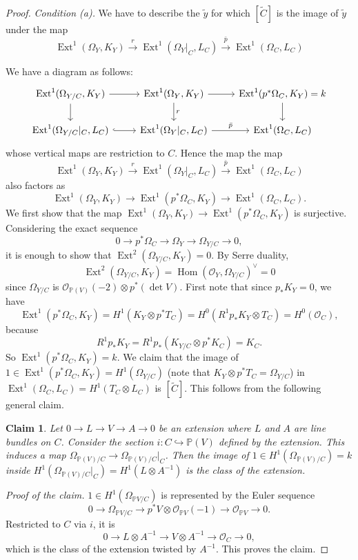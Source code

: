 \documentclass[11pt,twoside]{amsart}
\theoremstyle{plain}
\newtheorem{claim}[theorem]{Claim}
\theoremstyle{definition}
\newcommand{\PP}{\mathbb{P}}
\newcommand{\OO}{\mathcal{O}}
\newcommand{\Hom}{\operatorname{Hom}}
\newcommand{\Ext}{\operatorname{Ext}}
\newcommand{\Ct}{\widetilde{C}}
\newcommand{\yt}{\tilde{y}}
\begin{document}
\begin{proof}
\emph{Condition (a).} We have to describe the $\yt$ for which $[\Ct]$ is the image of $\yt$ under the map
\[
\Ext^1(\Omega_Y,K_Y)\xrightarrow{\ r\ }\Ext^1(\Omega_Y|_C,L_C)\xrightarrow{\ \bar p\ }\Ext^1(\Omega_C,L_C)
\]

We have a diagram as follows:
\begin{equation}\label{diag:B}
\begin{tikzcd}
\Ext^1(\Omega_{Y/C},K_Y)\arrow[r]\arrow[d] & \Ext^1(\Omega_Y,K_Y)\arrow[r]\arrow[d,"r"] & \Ext^1(p^*\Omega_C,K_Y)=k\arrow[d]\\
\Ext^1(\Omega_{Y/C}|_C,L_C)\arrow[r,hook] & \Ext^1(\Omega_Y|_C,L_C)\arrow[r,"\bar p"] & \Ext^1(\Omega_C,L_C)
\end{tikzcd}
\end{equation}
whose vertical maps are restriction to $C$.
Hence the map the map
\[
\Ext^1(\Omega_Y,K_Y)\xrightarrow{\ r\ }\Ext^1(\Omega_Y|_C,L_C)\xrightarrow{\ \bar p\ }\Ext^1(\Omega_C,L_C)
\]
also factors as
\[
\Ext^1(\Omega_Y,K_Y)\to\Ext^1(p^*\Omega_C,K_Y)\to\Ext^1(\Omega_C,L_C).
\]
We first show that the map $\Ext^1(\Omega_Y,K_Y)\to\Ext^1(p^*\Omega_C,K_Y)$ is surjective. Considering the exact sequence
\[
0\to p^*\Omega_C\to\Omega_Y\to\Omega_{Y/C}\to0 ,
\]
it is enough to show that $\Ext^2(\Omega_{Y/C},K_Y)=0$. By Serre duality,
\[
\Ext^2(\Omega_{Y/C},K_Y)=\Hom(\OO_Y,\Omega_{Y/C})^{\vee}=0
\]
since $\Omega_{Y/C}$ is $\OO_{\PP(V)}(-2)\otimes p^*(\det V)$. First note that since $p_*K_Y=0$, we have
\[
\Ext^1(p^*\Omega_C,K_Y)=H^1(K_Y\otimes p^*T_C)=H^0(R^1p_*K_Y\otimes T_C)=H^0(\OO_C),
\]
because
\[
R^1p_*K_Y=R^1p_*(K_{Y/C}\otimes p^*K_C)=K_C .
\]
So $\Ext^1(p^*\Omega_C,K_Y)=k$. We claim that the image of $1\in\Ext^1(p^*\Omega_C,K_Y)=H^1(\Omega_{Y/C})$ (note that $K_Y\otimes p^*T_C=\Omega_{Y/C}$) in $\Ext^1(\Omega_C,L_C)=H^1(T_C\otimes L_C)$ is $[\Ct]$. This follows from the following general claim.

\begin{claim}\label{claim:euler}
Let $0\to L\to V\to A\to0$ be an extension where $L$ and $A$ are line bundles on $C$. Consider the section $i\colon C\hookrightarrow\PP(V)$ defined by the extension. This induces a map $\Omega_{\PP(V)/C}\to\Omega_{\PP(V)/C}|_C$. Then the image of $1\in H^1(\Omega_{\PP(V)/C})=k$ inside $H^1(\Omega_{\PP(V)/C}|_C)=H^1(L\otimes A^{-1})$ is the class of the extension.
\end{claim}

\emph{Proof of the claim.} $1\in H^1(\Omega_{\PP V/C})$ is represented by the Euler sequence
\[
0\to\Omega_{\PP V/C}\to p^*V\otimes\OO_{\PP V}(-1)\to\OO_{\PP V}\to0 .
\]
Restricted to $C$ via $i$, it is
\[
0\to L\otimes A^{-1}\to V\otimes A^{-1}\to\OO_C\to0 ,
\]
which is the class of the extension twisted by $A^{-1}$. This proves the claim.


\end{proof}
\end{document}
